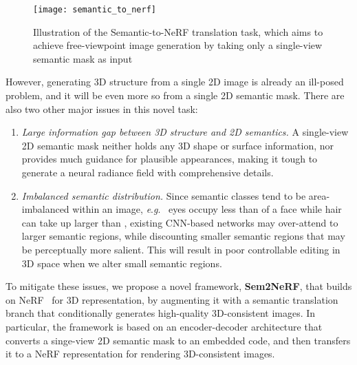 \documentclass[runningheads]{llncs}
\newcommand{\eg}{\textit{e}.\textit{g}.}
\begin{document}
\begin{figure}[t!]
    \centering
    \texttt{[image: semantic\_to\_nerf]}
    \caption{Illustration of the Semantic-to-NeRF translation task, which aims to achieve free-viewpoint image generation by taking only a single-view semantic mask as input}
    \label{fig:semantic_to_nerf}
\end{figure}

However, generating 3D structure from a single 2D image is already an ill-posed problem, and it will be even more so from a single 2D semantic mask. There are also two other major issues in this novel task:
\begin{enumerate}
    \item \emph{Large information gap between 3D structure and 2D semantics.} A single-view 2D semantic mask neither holds any 3D shape or surface information, nor provides much guidance for plausible appearances, making it tough to generate a neural radiance field with comprehensive details.
    \item \emph{Imbalanced semantic distribution.} Since semantic classes tend to be area-imbalanced within an image, \eg~ eyes occupy less than  of a face while hair can take up larger than , existing CNN-based networks may over-attend to larger semantic regions, while discounting smaller semantic regions that may be perceptually more salient. This will result in poor controllable editing in 3D space when we alter small semantic regions.
\end{enumerate}
To mitigate these issues, we propose a novel framework, \textbf{Sem2NeRF}, that builds on NeRF~\cite{mildenhall2020nerf} for 3D representation, by augmenting it with a semantic translation branch that conditionally generates high-quality 3D-consistent images. In particular, the framework is based on an encoder-decoder architecture that converts a singe-view 2D semantic mask to an embedded code, and then transfers it to a NeRF representation for rendering  3D-consistent images. 
\end{document}
